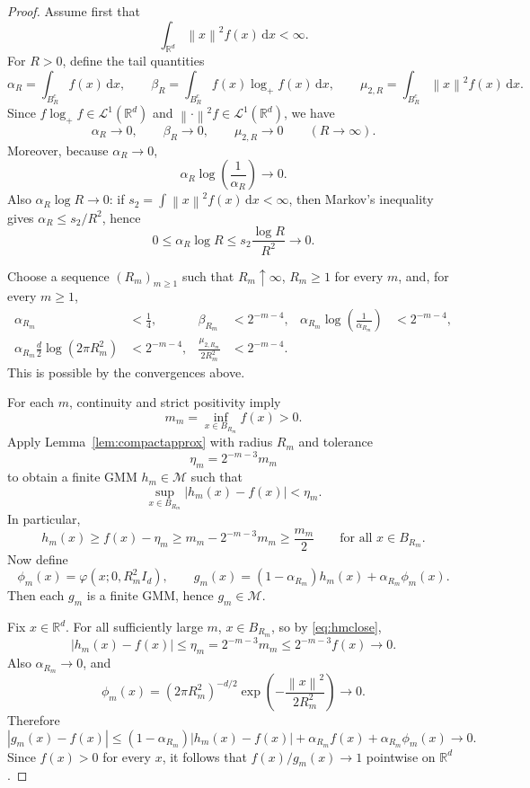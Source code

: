 \documentclass[11pt]{article}
\theoremstyle{definition}
\begin{document}
\begin{proof}
Assume first that
\[
\int_{\mathbb{R}^d}\left\lVert x \right\rVert^2f(x)\,\mathrm{d}x<\infty.
\]
For $R>0$, define the tail quantities
\[
\alpha_R=\int_{B_{R}^c} f(x)\,\mathrm{d}x,
\qquad
\beta_R=\int_{B_{R}^c} f(x)\log_+ f(x)\,\mathrm{d}x,
\qquad
\mu_{2,R}=\int_{B_{R}^c}\left\lVert x \right\rVert^2 f(x)\,\mathrm{d}x.
\]
Since $f\log_+f\in \mathcal L^1(\mathbb{R}^d)$ and $\left\lVert \cdot \right\rVert^2 f\in \mathcal L^1(\mathbb{R}^d)$, we have
\[
\alpha_R\to0,
\qquad
\beta_R\to0,
\qquad
\mu_{2,R}\to0
\qquad (R\to\infty).
\]
Moreover, because $\alpha_R\to0$,
\[
\alpha_R\log\!\left(\frac1{\alpha_R}\right)\to0.
\]
Also $\alpha_R\log R\to0$: if $s_2=\int \left\lVert x \right\rVert^2f(x)\,\mathrm{d}x<\infty$, then Markov's inequality gives $\alpha_R\le s_2/R^2$, hence
\[
0\le \alpha_R\log R\le s_2\frac{\log R}{R^2}\to0.
\]

Choose a sequence $(R_m)_{m\ge1}$ such that $R_m\uparrow\infty$, $R_m\ge1$ for every $m$, and, for every $m\ge1$,
\begin{equation}
\label{eq:Rmchoice}
\begin{aligned}
\alpha_{R_m}&<\tfrac14,
&\beta_{R_m}&<2^{-m-4},
&\alpha_{R_m}\log\!\left(\frac1{\alpha_{R_m}}\right)&<2^{-m-4},\\
\alpha_{R_m}\frac d2\log(2\pi R_m^2)&<2^{-m-4},
&\frac{\mu_{2,R_m}}{2R_m^2}&<2^{-m-4}.
\end{aligned}
\end{equation}
This is possible by the convergences above.

For each $m$, continuity and strict positivity imply
\[
m_m=\inf_{x\in B_{R_m}} f(x)>0.
\]
Apply Lemma~\ref{lem:compactapprox} with radius $R_m$ and tolerance
\[
\eta_m=2^{-m-3}m_m
\]
to obtain a finite GMM $h_m\in\mathcal M$ such that
\begin{equation}
\label{eq:hmclose}
\sup_{x\in B_{R_m}}|h_m(x)-f(x)|<\eta_m.
\end{equation}
In particular,
\begin{equation}
\label{eq:hmlower}
h_m(x)\ge f(x)-\eta_m\ge m_m-2^{-m-3}m_m\ge \frac{m_m}{2}
\qquad \text{for all }x\in B_{R_m}.
\end{equation}
Now define
\[
\phi_m(x)=\varphi(x;0,R_m^2 I_d),
\qquad
g_m(x)=(1-\alpha_{R_m})h_m(x)+\alpha_{R_m}\phi_m(x).
\]
Then each $g_m$ is a finite GMM, hence $g_m\in\mathcal M$.

Fix $x\in\mathbb{R}^d$. For all sufficiently large $m$, $x\in B_{R_m}$, so by \eqref{eq:hmclose},
\[
|h_m(x)-f(x)|\le \eta_m=2^{-m-3}m_m\le 2^{-m-3}f(x)\to0.
\]
Also $\alpha_{R_m}\to0$, and
\[
\phi_m(x)=(2\pi R_m^2)^{-d/2}\exp\!\left(-\frac{\left\lVert x \right\rVert^2}{2R_m^2}\right)\to0.
\]
Therefore
\[
|g_m(x)-f(x)|
\le (1-\alpha_{R_m})|h_m(x)-f(x)| + \alpha_{R_m}f(x)+\alpha_{R_m}\phi_m(x)\to0.
\]
Since $f(x)>0$ for every $x$, it follows that $f(x)/g_m(x)\to1$ pointwise on $\mathbb{R}^d$.


\end{proof}
\end{document}
